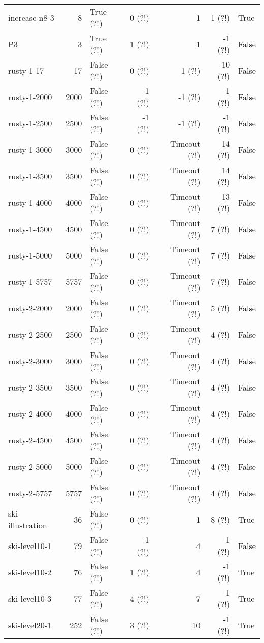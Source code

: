 \begin{longtable}{lrlrrrl}
increase-n8-3 & 8 & True (?!) & 0 (?!) & 1 & 1 (?!) & True \\
P3 & 3 & True (?!) & 1 (?!) & 1 & -1 (?!) & False \\
rusty-1-17 & 17 & False (?!) & 0 (?!) & 1 (?!) & 10 (?!) & False \\
rusty-1-2000 & 2000 & False (?!) & -1 (?!) & -1 (?!) & -1 (?!) & False \\
rusty-1-2500 & 2500 & False (?!) & -1 (?!) & -1 (?!) & -1 (?!) & False \\
rusty-1-3000 & 3000 & False (?!) & 0 (?!) & Timeout (?!) & 14 (?!) & False \\
rusty-1-3500 & 3500 & False (?!) & 0 (?!) & Timeout (?!) & 14 (?!) & False \\
rusty-1-4000 & 4000 & False (?!) & 0 (?!) & Timeout (?!) & 13 (?!) & False \\
rusty-1-4500 & 4500 & False (?!) & 0 (?!) & Timeout (?!) & 7 (?!) & False \\
rusty-1-5000 & 5000 & False (?!) & 0 (?!) & Timeout (?!) & 7 (?!) & False \\
rusty-1-5757 & 5757 & False (?!) & 0 (?!) & Timeout (?!) & 7 (?!) & False \\
rusty-2-2000 & 2000 & False (?!) & 0 (?!) & Timeout (?!) & 5 (?!) & False \\
rusty-2-2500 & 2500 & False (?!) & 0 (?!) & Timeout (?!) & 4 (?!) & False \\
rusty-2-3000 & 3000 & False (?!) & 0 (?!) & Timeout (?!) & 4 (?!) & False \\
rusty-2-3500 & 3500 & False (?!) & 0 (?!) & Timeout (?!) & 4 (?!) & False \\
rusty-2-4000 & 4000 & False (?!) & 0 (?!) & Timeout (?!) & 4 (?!) & False \\
rusty-2-4500 & 4500 & False (?!) & 0 (?!) & Timeout (?!) & 4 (?!) & False \\
rusty-2-5000 & 5000 & False (?!) & 0 (?!) & Timeout (?!) & 4 (?!) & False \\
rusty-2-5757 & 5757 & False (?!) & 0 (?!) & Timeout (?!) & 4 (?!) & False \\
ski-illustration & 36 & False (?!) & 0 (?!) & 1 & 8 (?!) & True \\
ski-level10-1 & 79 & False (?!) & -1 (?!) & 4 & -1 (?!) & False \\
ski-level10-2 & 76 & False (?!) & 1 (?!) & 4 & -1 (?!) & True \\
ski-level10-3 & 77 & False (?!) & 4 (?!) & 7 & -1 (?!) & True \\
ski-level20-1 & 252 & False (?!) & 3 (?!) & 10 & -1 (?!) & True \\

\end{longtable}
